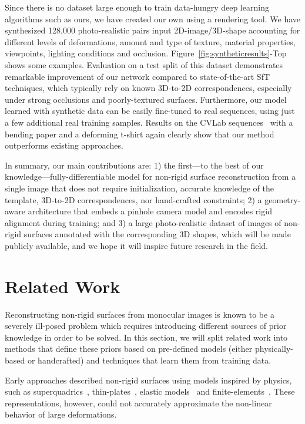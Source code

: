 \documentclass[10pt,twocolumn,letterpaper]{article}
\begin{document}
Since there is no dataset large enough to train data-hungry deep learning algorithms such as ours, we have created our own using a rendering tool. We have synthesized 128,000 photo-realistic pairs input 2D-image/3D-shape accounting for different levels of deformations, amount and type of texture, material properties, viewpoints, lighting conditions and occlusion. Figure~\ref{fig:syntheticresults}-Top shows some examples. Evaluation on a test split of this dataset demonstrates remarkable improvement of our network compared to state-of-the-art SfT techniques, which typically rely on known 3D-to-2D correspondences, especially under strong occlusions and poorly-textured surfaces. Furthermore, our model learned with synthetic data can be easily fine-tuned to real sequences, using just a few additional real training samples. Results on the CVLab sequences~\cite{varol2012constrained} with a bending paper and a deforming t-shirt again clearly show that our method outperforms existing approaches.


In summary, our main contributions are: 1) the first---to the best of our knowledge---fully-differentiable model for non-rigid surface reconstruction from a single image that does not require initialization,   accurate knowledge of the template, 3D-to-2D correspondences, nor hand-crafted constraints; 2) a geometry-aware architecture that embeds a pinhole camera model and encodes rigid alignment during training; and 3) a large photo-realistic dataset of images of non-rigid surfaces annotated  with the corresponding 3D shapes, which will be made publicly available, and we hope it will inspire future research in the field.



\section{Related Work}
Reconstructing non-rigid surfaces from monocular images is known to be a severely ill-posed problem which requires introducing different sources of prior knowledge in order to be solved. In this section, we will split related work into methods that define these priors based on pre-defined models (either physically-based or handcrafted) and techniques that learn them from training data.

Early approaches described non-rigid surfaces using models inspired by physics, such as superquadrics~\cite{metaxas1991constrained}, thin-plates~\cite{mcinerney1993finite}, elastic models~\cite{kita1996elastic} and finite-elements~\cite{mcinerney1995dynamic}. These representations, however, could not accurately approximate the non-linear behavior of large deformations. 
\end{document}

